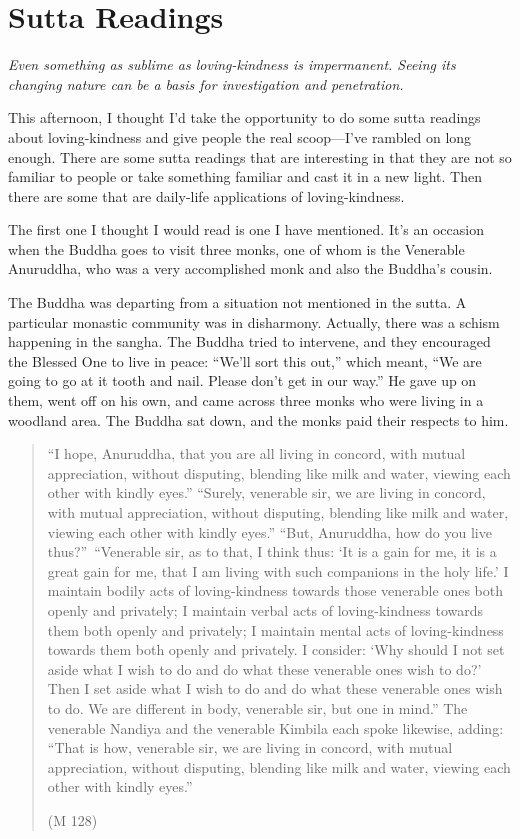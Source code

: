 \chapter{Sutta Readings}

\epigraph{\emph{Even something as sublime as loving-kindness is
impermanent. Seeing its changing nature can be a basis for investigation
and penetration.}}{}

This afternoon, I thought I’d take the opportunity to do some sutta
readings about loving-kindness and give people the real scoop—I’ve
rambled on long enough. There are some sutta readings that are
interesting in that they are not so familiar to people or take something
familiar and cast it in a new light. Then there are some that are
daily-life applications of loving-kindness.

The first one I thought I would read is one I have mentioned. It’s an
occasion when the Buddha goes to visit three monks, one of whom is the
Venerable Anuruddha, who was a very accomplished monk and also the
Buddha’s cousin.

The Buddha was departing from a situation not mentioned in the sutta. A
particular monastic community was in disharmony. Actually, there was a
schism happening in the sangha. The Buddha tried to intervene, and they
encouraged the Blessed One to live in peace: “We’ll sort this out,”
which meant, “We are going to go at it tooth and nail. Please don’t get
in our way.” He gave up on them, went off on his own, and came across
three monks who were living in a woodland area. The Buddha sat down, and
the monks paid their respects to him.

\begin{quotation}
“I hope, Anuruddha, that you are all living in concord, with mutual
appreciation, without disputing, blending like milk and water, viewing
each other with kindly eyes.” “Surely, venerable sir, we are living in
concord, with mutual appreciation, without disputing, blending like milk
and water, viewing each other with kindly eyes.” “But, Anuruddha, how do
you live thus?”~“Venerable sir, as to that, I think thus: ‘It is a gain
for me, it is a great gain for me, that I am living with such companions
in the holy life.’ I maintain bodily acts of loving-kindness towards
those venerable ones both openly and privately; I maintain verbal acts
of loving-kindness towards them both openly and privately; I maintain
mental acts of loving-kindness towards them both openly and privately. I
consider: ‘Why should I not set aside what I wish to do and do what
these venerable ones wish to do?’ Then I set aside what I wish to do and
do what these venerable ones wish to do. We are different in body,
venerable sir, but one in mind.” The venerable Nandiya and the venerable
Kimbila each spoke likewise, adding: “That is how, venerable sir, we are
living in concord, with mutual appreciation, without disputing, blending
like milk and water, viewing each other with kindly eyes.”

\hfill(M 128)
\end{quotation}


